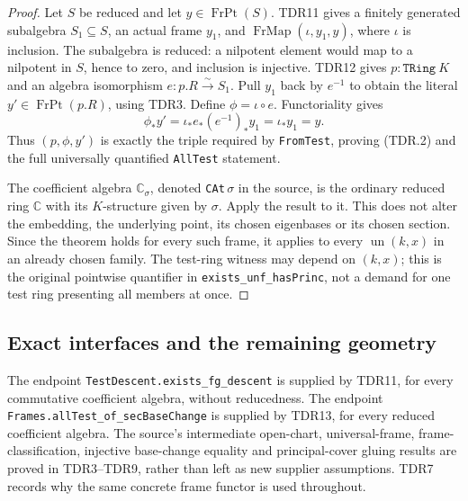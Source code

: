 \documentclass[11pt,a4paper]{article}
\numberwithin{equation}{section}
\theoremstyle{remark}\newtheorem{remark}[theorem]{Remark}
\begin{document}
\begin{proof}
Let \(S\) be reduced and let \(y\in\operatorname{FrPt}(S)\).
TDR11 gives a finitely generated subalgebra \(S_1\subseteq S\),
an actual frame \(y_1\), and
\(\operatorname{FrMap}(\iota,y_1,y)\), where \(\iota\)
is inclusion.  The subalgebra is reduced: a nilpotent element
would map to a nilpotent in \(S\), hence to zero, and inclusion
is injective.  TDR12 gives \(p:\texttt{TRing}\ K\) and
an algebra isomorphism \(e:p.R\xrightarrow{\sim}S_1\).
Pull \(y_1\) back by \(e^{-1}\) to obtain the literal
\(y'\in\operatorname{FrPt}(p.R)\), using TDR3.  Define
\(\phi=\iota\circ e\).  Functoriality gives
\[
 \phi_*y'=\iota_*e_*(e^{-1})_*y_1
         =\iota_*y_1=y.                                    \tag{TDR.12}
\]
Thus \((p,\phi,y')\) is exactly the triple required by
\texttt{From\allowbreak Test}, proving (TDR.2) and the full universally
quantified \texttt{All\allowbreak Test} statement.

The coefficient algebra \(\mathbb C_\sigma\), denoted
\texttt{CAt}\(\,\sigma\) in the source, is the ordinary
reduced ring \(\mathbb C\) with its \(K\)-structure given
by \(\sigma\).  Apply the result to it.  This does not alter
the embedding, the underlying point, its chosen eigenbases or
its chosen section.  Since the theorem holds for every such
frame, it applies to every \(\operatorname{un}(k,x)\) in
an already chosen family.  The test-ring witness may depend
on \((k,x)\); this is the original pointwise quantifier in
\texttt{exists\_\allowbreak unf\_\allowbreak has\allowbreak Princ}, not a demand for one test
ring presenting all members at once.
\end{proof}

\subsection{Exact interfaces and the remaining geometry}

The endpoint \texttt{Test\allowbreak Descent.\allowbreak exists\_\allowbreak fg\_\allowbreak descent} is supplied
by TDR11, for every commutative coefficient algebra, without
reducedness.  The endpoint
\texttt{Frames.\allowbreak all\allowbreak Test\_\allowbreak of\_\allowbreak sec\allowbreak Base\allowbreak Change} is supplied by TDR13,
for every reduced coefficient algebra.  The source's intermediate
open-chart, universal-frame, frame-classification, injective
base-change equality and principal-cover gluing results are
proved in TDR3--TDR9, rather than left as new supplier assumptions.
TDR7 records why the same concrete frame functor is used throughout.
\end{document}
